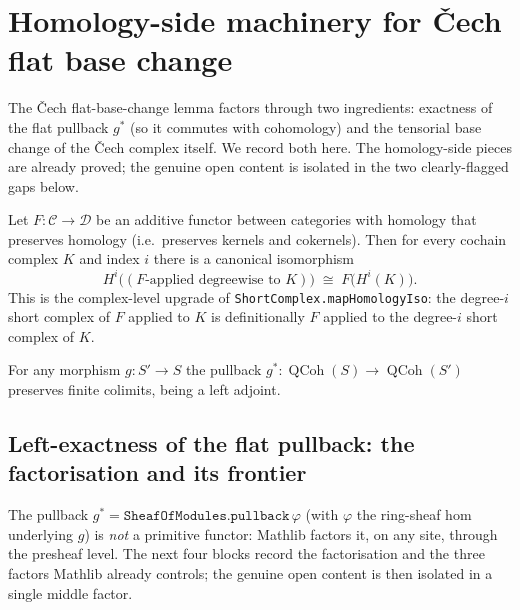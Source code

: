 \section{Homology-side machinery for {\v C}ech flat base change}

The {\v C}ech flat-base-change lemma factors through two ingredients: exactness of the
flat pullback \(g^*\) (so it commutes with cohomology) and the tensorial base change of
the {\v C}ech complex itself. We record both here. The homology-side pieces are
already proved; the genuine open content is isolated in the two clearly-flagged gaps below.

\begin{lemma}
  \label{lem:map_hc_homology_iso}
  Let \(F : \mathcal{C} \to \mathcal{D}\) be an additive functor between categories
  with homology that preserves homology (i.e.\ preserves kernels and cokernels). Then
  for every cochain complex \(K\) and index \(i\) there is a canonical isomorphism
  \[
    H^i\bigl((F\text{-applied degreewise to } K)\bigr) \;\cong\; F\bigl(H^i(K)\bigr).
  \]
  This is the complex-level upgrade of \texttt{ShortComplex.mapHomologyIso}: the
  degree-\(i\) short complex of \(F\) applied to \(K\) is definitionally \(F\) applied
  to the degree-\(i\) short complex of \(K\).
\end{lemma}

\begin{lemma}
  \label{lem:pullback_preserves_finite_colimits}
  For any morphism \(g : S' \to S\) the pullback \(g^* : \operatorname{QCoh}(S) \to
  \operatorname{QCoh}(S')\) preserves finite colimits, being a left adjoint.
\end{lemma}

\subsection{Left-exactness of the flat pullback: the factorisation and its frontier}
\label{sec:pullback_pfl_decomposition}

The pullback \(g^* = \texttt{SheafOfModules.pullback}\,\varphi\) (with \(\varphi\)
the ring-sheaf hom underlying \(g\)) is \emph{not} a primitive functor: Mathlib
factors it, on any site, through the presheaf level. The next four blocks record the
factorisation and the three factors Mathlib already controls; the genuine open
content is then isolated in a single middle factor.

